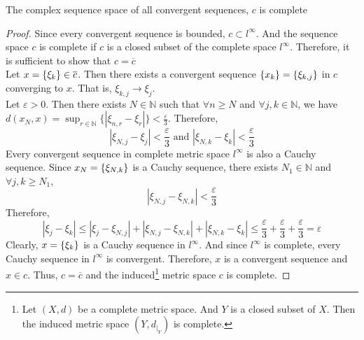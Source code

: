 \begin{theorem}
	The complex sequence space of all convergent sequences, $c$ is complete
\end{theorem}
\begin{proof}
	Since every convergent sequence is bounded, $c \subset l^\infty$.
	And the sequence space $c$ is complete if $c$ is a closed subset of the complete space $l^\infty$.
	Therefore, it is sufficient to show that $c = \overline{c}$\\

	Let $x = \left\{\xi_k\right\} \in \overline{c}$.	
	Then there exists a convergent sequence $\left\{x_k\right\} = \left\{\xi_{k,j}\right\}$ in $c$ converging to $x$.
	That is, $\xi_{k,j} \to \xi_j$.\\

	Let $\varepsilon > 0$.
	Then there exists $N \in \mathbb{N}$ such that $\forall n \ge N$ and $\forall j,k \in \mathbb{N}$, we have $\displaystyle d(x_N,x) = \sup_{r \in \mathbb{N}} \{ |\xi_{n,r} - \xi_r| \} < \frac{\varepsilon}{3}$.
	Therefore,
	\begin{equation}
		|\xi_{N,j} - \xi_j| < \frac{\varepsilon}{3} \text{ and } |\xi_{N,k} - \xi_k| < \frac{\varepsilon}{3} 
	\end{equation}
	Every convergent sequence in complete metric space $l^\infty$ is also a Cauchy sequence.
	Since $x_N = \left\{\xi_{N,k}\right\}$ is a Cauchy sequence, there exists $N_1 \in \mathbb{N}$ and $\forall j,k \ge N_1$,
	\begin{equation}
		|\xi_{N,j} - \xi_{N,k}| < \frac{\varepsilon}{3}
	\end{equation}
	Therefore,
	\[ |\xi_j - \xi_k| \le |\xi_j - \xi_{N,j}| + |\xi_{N,j}-\xi_{N,k}| + |\xi_{N,k} - \xi_k| \le \frac{\varepsilon}{3} + \frac{\varepsilon}{3} + \frac{\varepsilon}{3} = \varepsilon \]
	Clearly, $x = \left\{\xi_k\right\}$ is a Cauchy sequence in $l^\infty$.
	And since $l^\infty$ is complete, every Cauchy sequence in $l^\infty$ is convergent.
	Therefore, $x$ is a convergent sequence and $x \in c$.
	Thus, $c = \overline{c}$ and the induced\dag\footnote{
		Let $(X,d)$ be a complete metric space.
		And $Y$ is a closed subset of $X$.
		Then the induced metric space $(Y,d_{|_Y})$ is complete.}
	metric space $c$ is complete.
\end{proof}

